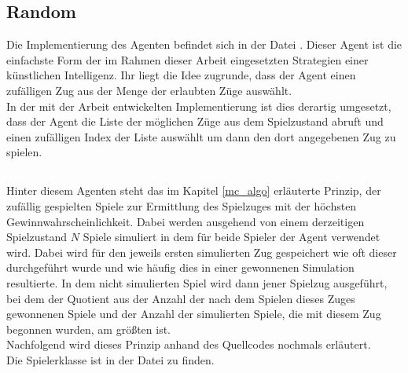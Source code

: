 \subsection{Random}
Die Implementierung des Agenten  befindet sich in der Datei . Dieser Agent ist die einfachste Form der im Rahmen dieser Arbeit eingesetzten Strategien einer künstlichen Intelligenz. Ihr liegt die Idee zugrunde, dass der Agent einen zufälligen Zug aus der Menge der erlaubten Züge auswählt.
\\In der mit der Arbeit entwickelten Implementierung ist dies derartig umgesetzt, dass der Agent die Liste der möglichen Züge aus dem Spielzustand abruft und einen zufälligen Index der Liste auswählt um dann den dort angegebenen Zug zu spielen.

\subsection{\mc}
Hinter diesem Agenten steht das im Kapitel \ref{mc_algo} erläuterte Prinzip, der zufällig gespielten Spiele zur Ermittlung des Spielzuges mit der höchsten Gewinnwahrscheinlichkeit. Dabei werden ausgehend von einem derzeitigen Spielzustand $N$ Spiele simuliert in dem für beide Spieler der Agent  verwendet wird. Dabei wird für den jeweils ersten simulierten Zug gespeichert wie oft dieser durchgeführt wurde und wie häufig dies in einer gewonnenen Simulation resultierte. In dem nicht simulierten Spiel wird dann jener Spielzug ausgeführt, bei dem der Quotient aus der Anzahl der nach dem Spielen dieses Zuges gewonnenen Spiele und der Anzahl der simulierten Spiele, die mit diesem Zug begonnen wurden, am größten ist.
\\Nachfolgend wird dieses Prinzip anhand des Quellcodes nochmals erläutert.
\\Die Spielerklasse  ist in der Datei  zu finden.
